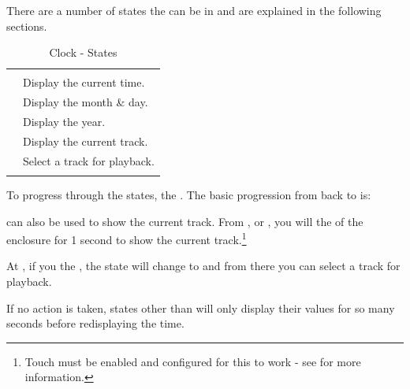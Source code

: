 There are a number of states the  can be in and are explained in the
following sections.

\begin{table}[H]
\centering
\begin{tabu} { X[1,c,m] | X[3,l,m] }
  \thrule
   &  \\ \mrule
   & Display the current time. \\ 
   & Display the month \& day. \\ 
   & Display the year.  \\ 
   & Display the current track. \\ 
   & Select a track for playback. \\
  \bhrule
\end{tabu}
\caption{Clock - States}
\end{table}

To progress through the states,  the .  The basic progression from
 back to  is:


 can also be used to show the current track.  From , 
or , you will  the  of the enclosure for \num{1} second
to show the current track.\footnote{ Touch must be enabled and configured for
this to work - see \hyperref[Touch Settings]{} for more information.}


At , if you  the , the state will change to  and
from there you can select a track for playback.


If no action is taken, states other than  will only display their
values for so many seconds before redisplaying the time.


